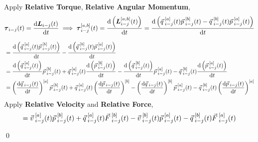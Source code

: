 \documentclass[12pt]{amsart}
\renewenvironment{proof}{{\bfseries Proof.}}{\qed}
\let\oldvec\vec
\renewcommand{\vec}[1]{\oldvec{#1}\hspace{0.1em}}
\begin{document}
\begin{proof}

Apply \textbf{Relative Torque}, \textbf{Relative Angular Momentum},
$$ \boldsymbol{\tau}_{i-j} (t) = \dfrac{\mathrm{d} \boldsymbol{L}_{i-j}(t)}{\mathrm{d} t} \implies \boldsymbol{\tau}^{[a,b]}_{i-j} (t) = \dfrac{\mathrm{d} \left ( \boldsymbol{L}^{[a,b]}_{i-j} (t) \right )}{\mathrm{d} t} = \dfrac{\mathrm{d} \left (\vec{q}^{[a]}_{i-j} (t) \vec{p}^{[b]}_{i-j} (t) - \vec{q}^{[b]}_{i-j} (t) \vec{p}^{[a]}_{i-j} (t) \right )}{\mathrm{d} t} $$
    
\begin{align*} &= \dfrac{\mathrm{d} \left ( \vec{q}^{[a]}_{i-j} (t) \vec{p}^{[b]}_{i-j} (t) \right )}{\mathrm{d} t} - \dfrac{\mathrm{d} \left ( \vec{q}^{[b]}_{i-j} (t) \vec{p}^{[a]}_{i-j} (t) \right )}{\mathrm{d} t} \\
&= \dfrac{\mathrm{d} \left ( \vec{q}^{[a]}_{i-j} (t) \right )}{\mathrm{d} t} \vec{p}^{[b]}_{i-j} (t) + \vec{q}^{[a]}_{i-j} (t) \dfrac{\mathrm{d} \left ( \vec{p}^{[b]}_{i-j} (t) \right )}{\mathrm{d} t} - \dfrac{\mathrm{d} \left ( \vec{q}^{[b]}_{i-j} (t) \right ) }{\mathrm{d} t} \vec{p}^{[a]}_{i-j} (t) - \vec{q}^{[b]}_{i-j} (t) \dfrac{\mathrm{d} \left ( \vec{p}^{[a]}_{i-j} (t) \right ) }{\mathrm{d} t} \\
&= \left ( \dfrac{\mathrm{d}  \vec{q}_{i-j} (t)}{\mathrm{d} t} \right ) ^{[a]} \vec{p}^{[b]}_{i-j} (t) + \vec{q}^{[a]}_{i-j} (t) \left (  \dfrac{\mathrm{d} \vec{p}_{i-j} (t)}{\mathrm{d} t} \right )^{[b]} - \left (\dfrac{\mathrm{d}  \vec{q}_{i-j} (t) }{\mathrm{d} t}\right ) ^{[b]} \vec{p}^{[a]}_{i-j} (t) - \vec{q}^{[b]}_{i-j} (t) \left ( \dfrac{\mathrm{d}  \vec{p}_{i-j} (t) }{\mathrm{d} t}  \right )^{[a]}
\end{align*}
Apply \textbf{Relative Velocity} and \textbf{Relative Force}, 
$$= \vec{v}_{i-j} ^{[a]} (t) \vec{p}^{[b]}_{i-j} (t) + \vec{q}^{[a]}_{i-j} (t) \vec{F}_{i-j}^{[b]} (t) - \vec{v}_{i-j} ^{[b]} (t) \vec{p}^{[a]}_{i-j} (t) - \vec{q}^{[b]}_{i-j} (t) \vec{F}_{i-j}^{[a]} (t)$$


\end{proof}
\end{document}
